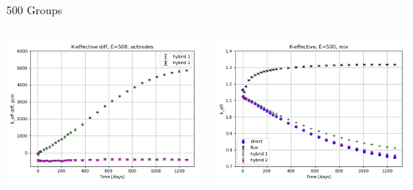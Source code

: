 \documentclass[
	11pt, %
	aspectratio=169, %
]{beamer}
\begin{document}
\begin{frame}{500 Groups}
\begin{columns}[c]
\begin{column}{0.32\textwidth}
			\includegraphics[width=\textwidth]{../figures/keff/keff_actinides_500_diff.png}
		\end{column}
		\begin{column}{0.32\textwidth} %
			\includegraphics[width=\textwidth]{../figures/keff/keff_mix_500.png}


\end{column}
\end{columns}
\end{frame}
\end{document}
